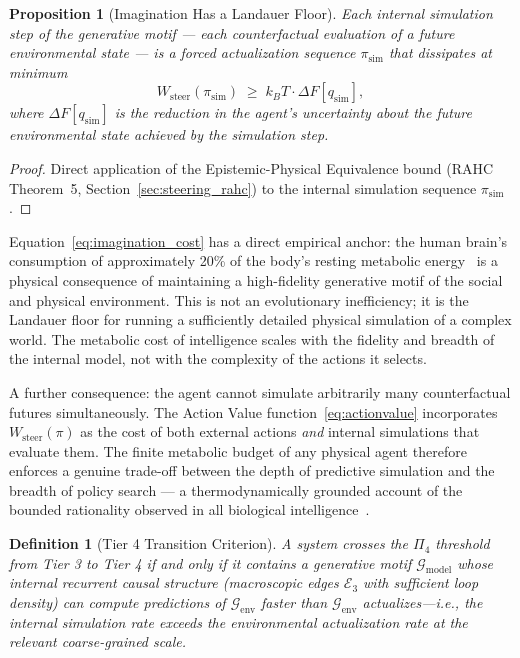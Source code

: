 \documentclass[11pt,a4paper]{article}
\newtheorem{definition}[theorem]{Definition}
\newtheorem{proposition}[theorem]{Proposition}
\theoremstyle{remark}
\newcommand{\GG}{\mathcal{G}}
\newcommand{\EE}{\mathcal{E}}
\begin{document}
\begin{proposition}[Imagination Has a Landauer Floor]
\label{prop:imagination}
Each internal simulation step of the generative motif --- each counterfactual
evaluation of a future environmental state --- is a forced actualization sequence
$\pi_{\mathrm{sim}}$ that dissipates at minimum
\begin{equation}
  W_{\mathrm{steer}}(\pi_{\mathrm{sim}}) \;\geq\; k_BT \cdot \Delta F[q_{\mathrm{sim}}],
  \label{eq:imagination_cost}
\end{equation}
where $\Delta F[q_{\mathrm{sim}}]$ is the reduction in the agent's uncertainty
about the future environmental state achieved by the simulation step.
\end{proposition}

\begin{proof}
Direct application of the Epistemic-Physical Equivalence bound
(RAHC Theorem~5, Section~\ref{sec:steering_rahc}) to the internal simulation
sequence $\pi_{\mathrm{sim}}$.
\end{proof}

Equation~\eqref{eq:imagination_cost} has a direct empirical anchor: the human
brain's consumption of approximately 20\% of the body's resting metabolic
energy~\citep{Attwell2001} is a physical consequence of maintaining a
high-fidelity generative motif of the social and physical environment. This is
not an evolutionary inefficiency; it is the Landauer floor for running a
sufficiently detailed physical simulation of a complex world. The metabolic cost
of intelligence scales with the fidelity and breadth of the internal model, not
with the complexity of the actions it selects.

A further consequence: the agent cannot simulate arbitrarily many counterfactual
futures simultaneously. The Action Value function~\eqref{eq:actionvalue}
incorporates $W_{\mathrm{steer}}(\pi)$ as the cost of both external actions
\emph{and} internal simulations that evaluate them. The finite metabolic budget
of any physical agent therefore enforces a genuine trade-off between the depth
of predictive simulation and the breadth of policy search --- a thermodynamically
grounded account of the bounded rationality observed in all biological
intelligence~\citep{Kauffman2000}.

\begin{definition}[Tier 4 Transition Criterion]
A system crosses the $\Pi_4$ threshold from Tier 3 to Tier 4 if and only if
it contains a generative motif $\GG_{\mathrm{model}}$ whose internal recurrent
causal structure (macroscopic edges $\EE_3$ with sufficient loop density) can
compute predictions of $\GG_{\mathrm{env}}$ faster than $\GG_{\mathrm{env}}$
actualizes---i.e., the internal simulation rate exceeds the environmental
actualization rate at the relevant coarse-grained scale.
\end{definition}
\end{document}
